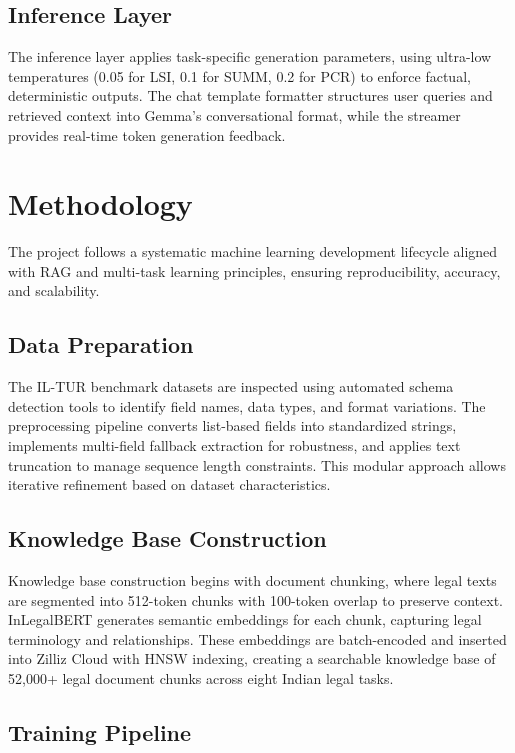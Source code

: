 \documentclass[11pt]{article}
\begin{document}
\subsection{Inference Layer}

The inference layer applies task-specific generation parameters, using ultra-low temperatures (0.05 for LSI, 0.1 for SUMM, 0.2 for PCR) to enforce factual, deterministic outputs. The chat template formatter structures user queries and retrieved context into Gemma's conversational format, while the streamer provides real-time token generation feedback.

\section{Methodology}

The project follows a systematic machine learning development lifecycle aligned with RAG and multi-task learning principles, ensuring reproducibility, accuracy, and scalability.

\subsection{Data Preparation}

The IL-TUR benchmark datasets are inspected using automated schema detection tools to identify field names, data types, and format variations. The preprocessing pipeline converts list-based fields into standardized strings, implements multi-field fallback extraction for robustness, and applies text truncation to manage sequence length constraints. This modular approach allows iterative refinement based on dataset characteristics.

\subsection{Knowledge Base Construction}

Knowledge base construction begins with document chunking, where legal texts are segmented into 512-token chunks with 100-token overlap to preserve context. InLegalBERT generates semantic embeddings for each chunk, capturing legal terminology and relationships. These embeddings are batch-encoded and inserted into Zilliz Cloud with HNSW indexing, creating a searchable knowledge base of 52,000+ legal document chunks across eight Indian legal tasks.

\subsection{Training Pipeline}
\end{document}
